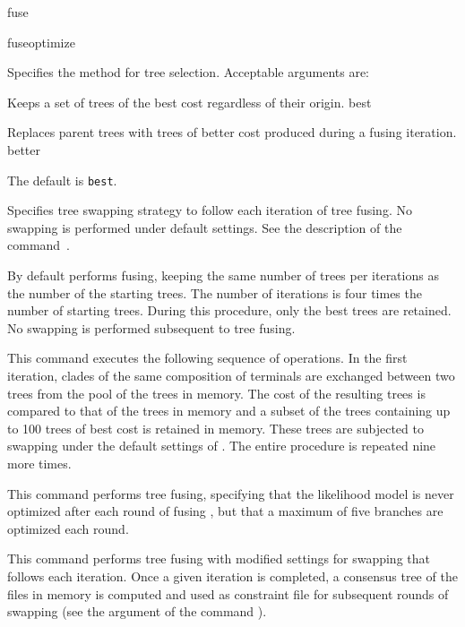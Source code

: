 \begin{command}{fuse}{}
\begin{arguments}
{\begin{description}
\end{description}
}
{fuseoptimize}

{Specifies the method for tree selection. Acceptable arguments
are:

\begin{description}
 {}
{Keeps a set of trees of the best cost regardless of their origin.}
{best}

 {}
{Replaces parent trees with trees of better cost
produced during a fusing iteration.}
{better}

\end{description}

The default is \texttt{best}.}
{}

{Specifies tree swapping strategy to follow each iteration of tree fusing.
No swapping is performed under default settings.
See the description of the command~.}
{}

\end{arguments}

{By default \poy performs fusing, keeping the same number of trees per
iterations as the number of the starting trees. The number of iterations is
four times the number of starting trees. During this procedure, only the best
trees are retained. No swapping is performed subsequent to tree fusing.}

\begin{poyexamples}

{This command executes the following sequence of operations. In the
first iteration, clades of the same composition of terminals are exchanged
between two trees from the pool of the trees in memory. The cost of the
resulting trees is compared to that of the trees in memory and a subset of
the trees containing up to 100 trees of best cost is retained in memory.
These trees are subjected to swapping under the default settings of
. The entire procedure is repeated nine more times.}

{This command performs tree fusing, specifying that the likelihood model is never optimized 
after each round of fusing , but that a maximum of five branches are optimized
each round.}

{This command performs tree fusing 
with modified settings for swapping that follows each iteration. Once
a given iteration is completed, a consensus tree of the files in memory
is computed and used as constraint file for subsequent rounds of swapping (see
the argument  of the command
).}  

\end{poyexamples}

\begin{poyalso}
\end{poyalso}

\end{command}

